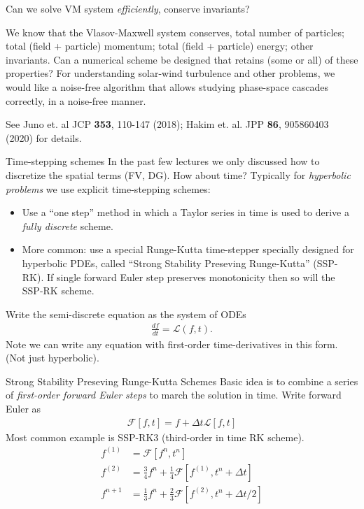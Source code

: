 \documentclass[aspectratio=169]{beamer}
\newcommand{\mypause}{}
\begin{document}
\begin{frame}{Can we solve VM system \emph{efficiently}, conserve
    invariants?}

  We know that the Vlasov-Maxwell system conserves, total number of
  particles; total (field + particle) momentum; total (field +
  particle) energy; other invariants. Can a numerical scheme be
  designed that retains (some or all) of these properties?%
  \vskip0.1in%
  For understanding solar-wind turbulence and other problems, we would
  like a noise-free algorithm that allows studying phase-space
  cascades correctly, in a noise-free manner.%

  \vskip0.1in%
  See Juno et. al JCP {\bf 353}, 110-147 (2018); Hakim et. al. JPP
  {\bf 86}, 905860403 (2020) for details.

\end{frame}

\begin{frame}{Time-stepping schemes}
  In the past few lectures we only discussed how to discretize the
  spatial terms (FV, DG). How about time? Typically for
  \emph{hyperbolic problems} we use explicit time-stepping schemes:
  \begin{itemize}
  \item Use a ``one step'' method in which a Taylor series in time is
    used to derive a \emph{fully discrete} scheme.
  \item More common: use a special Runge-Kutta time-stepper specially
    designed for hyperbolic PDEs, called ``Strong Stability Preseving
    Runge-Kutta'' (SSP-RK). If single forward Euler step preserves
    monotonicity then so will the SSP-RK scheme.
  \end{itemize}
  \mypause%
  Write the semi-discrete equation as the system of ODEs
  \begin{align*}
    \frac{df}{dt} = \mathcal{L}(f,t).
  \end{align*}
  Note we can write any equation with first-order time-derivatives in
  this form. (Not just hyperbolic).
\end{frame}

\begin{frame}{Strong Stability Preseving Runge-Kutta Schemes}
  Basic idea is to combine a series of \emph{first-order forward Euler
    steps} to march the solution in time. Write forward Euler as
  \begin{align*}
    \mathcal{F}[f, t]=f+\Delta t \mathcal{L}[f, t]
  \end{align*}
  \mypause%
  Most common example is SSP-RK3 (third-order in time RK scheme).
  \begin{align*}
    f^{(1)} &=\mathcal{F}\left[f^{n}, t^{n}\right] \\
    f^{(2)} &=\frac{3}{4} f^{n}+\frac{1}{4} \mathcal{F}\left[f^{(1)}, t^{n}+\Delta t\right] \\
    f^{n+1} &=\frac{1}{3} f^{n}+\frac{2}{3} \mathcal{F}\left[f^{(2)}, t^{n}+\Delta t / 2\right]
  \end{align*}
\end{frame}
\end{document}
